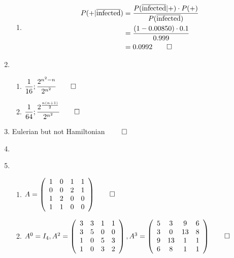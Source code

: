 \documentclass[12pt, a4paper]{article}
\begin{document}
\begin{enumerate}[Q\arabic*.]
\begin{enumerate}[(\alph*)]
      \item 
        \begin{align*}
          P(+|\overline{\text{infected}}) &= \frac{P(\overline{\text{infected}}|+)\cdot P(+)}{P(\overline{\text{infected}})}\\
                                             &= \frac{(1-0.00850)\cdot 0.1}{0.999}\\
                                             &= 0.0992 \qed
        \end{align*}
    \end{enumerate}

  \item 
    \begin{enumerate}[(\alph*)]
      \item $\displaystyle \frac{1}{16}; \frac{2^{n^2-n}}{2^{n^2}} \qed$
      \item $\displaystyle \frac{1}{64}; \frac{2^{\frac{n(n+1)}{2}}}{2^{n^2}} \qed$ 
    \end{enumerate}

  \item Eulerian but not Hamiltonian $\qed$
  \pagebreak
  \item \quad\\

  \item 
    \begin{enumerate}[(\alph*)]
      \item $A = \left(\begin{array}{cccc} 1 & 0 & 1 & 1\\ 0 & 0 & 2 & 1\\ 1 & 2 & 0 & 0\\ 1 & 1 & 0 & 0 \end{array}\right) \qed$

      \item $A^0 = I_4, A^2 = \left(\begin{array}{cccc} 3 & 3 & 1 & 1\\ 3 & 5 & 0 & 0\\ 1 & 0 & 5 & 3\\ 1 & 0 & 3 & 2 \end{array}\right), A^3 = \left(\begin{array}{cccc} 5 & 3 & 9 & 6\\ 3 & 0 & 13 & 8\\ 9 & 13 & 1 & 1\\ 6 & 8 & 1 & 1 \end{array}\right) \qed$


\end{enumerate}
\end{enumerate}
\end{document}
